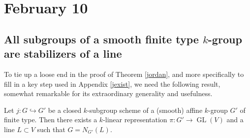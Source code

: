 \documentclass[10pt]{article}
\newcommand{\GL}{\operatorname{GL}}
\renewcommand{\(}{\left(}
\renewcommand{\)}{\right)}
\newcommand{\into}{\hookrightarrow}
\numberwithin{thm}{subsection}
\begin{document}
\section{February 10}
\subsection{All subgroups of a smooth finite type $k$-group
are stabilizers of a line}
To tie up a loose end in the proof of Theorem \ref{jordan},
and more specifically to fill in a key step used in Appendix \ref{jexist}, 
we need the following result, somewhat remarkable for its extraordinary generality and usefulness.

\begin{thm}\label{subgroupfixline}
 Let $j:G\into G'$ be a closed $k$-subgroup scheme
of a (smooth) affine $k$-group $G'$ of finite type.
Then there exists a $k$-linear representation $\pi:G'\to \GL(V)$
and a line $L\subset V$ such 
that $G=N_{G'}(L)$.
\end{thm}
\end{document}
